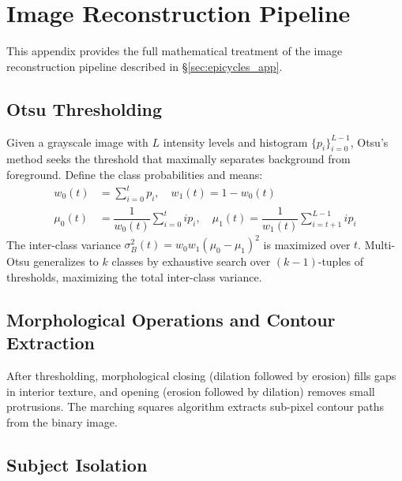\documentclass[12pt,a4paper]{report}
\theoremstyle{thms}
\theoremstyle{defns}
\begin{document}
\chapter{Image Reconstruction Pipeline}
\label{app:image_pipeline}

This appendix provides the full mathematical treatment of the image reconstruction pipeline described in \S\ref{sec:epicycles_app}.

\section{Otsu Thresholding}

Given a grayscale image with $L$ intensity levels and histogram $\{p_i\}_{i=0}^{L-1}$, Otsu's method \cite{otsu_threshold} seeks the threshold that maximally separates background from foreground. Define the class probabilities and means:
\begin{align}
    w_0(t) &= \sum_{i=0}^{t} p_i, \quad w_1(t) = 1 - w_0(t) \\
    \mu_0(t) &= \dfrac{1}{w_0(t)}\sum_{i=0}^{t} ip_i, \quad \mu_1(t) = \dfrac{1}{w_1(t)}\sum_{i=t+1}^{L-1} ip_i
\end{align}
The inter-class variance $\sigma_B^2(t) = w_0 w_1 (\mu_0 - \mu_1)^2$ is maximized over $t$. Multi-Otsu generalizes to $k$ classes by exhaustive search over $(k-1)$-tuples of thresholds, maximizing the total inter-class variance.

\section{Morphological Operations and Contour Extraction}

After thresholding, morphological closing (dilation followed by erosion) fills gaps in interior texture, and opening (erosion followed by dilation) removes small protrusions. The marching squares algorithm extracts sub-pixel contour paths from the binary image.

\section{Subject Isolation}
\label{sec:subject_isolation}
\end{document}

